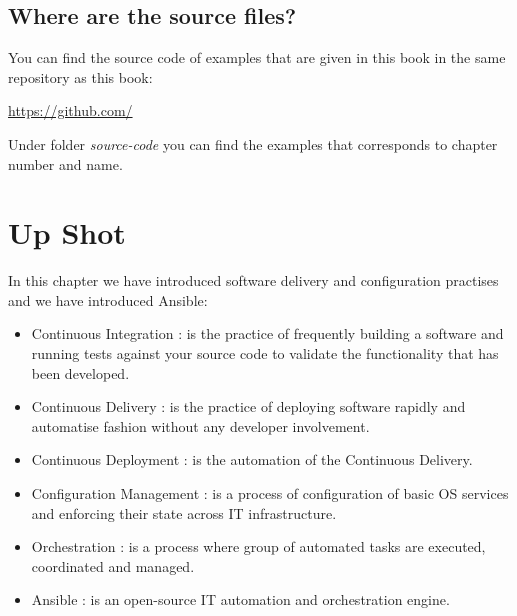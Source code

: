 \documentclass[10pt]{book}
\begin{document}
\subsection{Where are the source files?}
\label{sec:book-source-codes}
You can find the source code of examples that are given in this book 
in the same repository as this book:

\url{https://github.com/}

Under folder \emph{source-code} you can find the examples that corresponds to 
chapter number and name.

\section{Up Shot}
In this chapter we have introduced software delivery and configuration practises 
and we have introduced Ansible:

\begin{itemize}
\item Continuous Integration : is the practice of frequently building a software and running tests against 
your source code to validate the functionality that has been developed.

\item Continuous Delivery : is the practice of deploying software rapidly and 
automatise fashion without any developer involvement.

\item Continuous Deployment : is the automation of the Continuous Delivery. 

\item Configuration Management : is a process of configuration of basic OS 
services and enforcing their state across IT infrastructure. 

\item Orchestration : is a process where group of automated tasks are executed, 
coordinated and managed.

\item Ansible :  is an open-source IT automation and orchestration engine.

\end{itemize}







\end{document}
